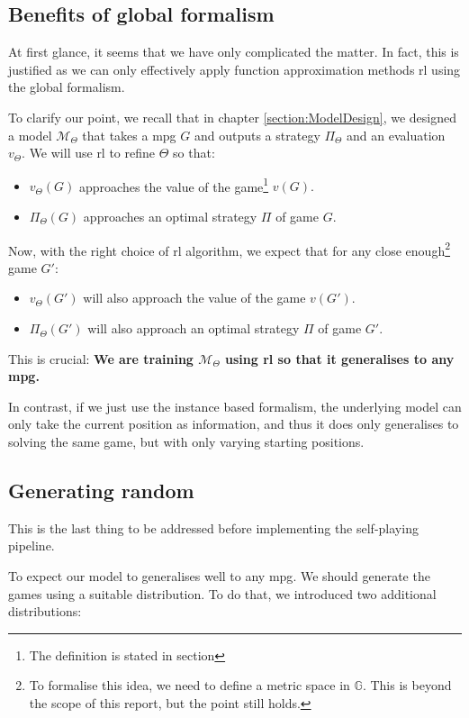 	\subsection{Benefits of global formalism}
	At first glance, it seems that we have only complicated the matter. In fact, this is justified as we can only effectively apply function approximation methods \acrshort{rl} using the global formalism.
	
	To clarify our point, we recall that in chapter \ref{section:ModelDesign}, we designed a model $\mathcal{M}_\Theta$ that takes a \acrshort{mpg} $G$ and outputs a strategy $\Pi_\Theta$ and an evaluation $v_\Theta.$ We will use \acrshort{rl} to refine $\Theta$ so that: 
	\begin{itemize}
		\item $v_\Theta(G)$ approaches the value of the game\footnote{The definition is stated in section} $v(G).$
		\item $\Pi_\Theta(G)$ approaches an optimal strategy $\Pi$ of game $G.$
	\end{itemize}
	Now, with the right choice of \acrshort{rl} algorithm, we expect that for any close enough\footnote{To formalise this idea, we need to define a metric space in $\mathbb{G}.$ This is beyond the scope of this report, but the point still holds.} game $G':$
	\begin{itemize}
		\item $v_\Theta(G')$ will also approach the value of the game $v(G').$
		\item $\Pi_\Theta(G')$ will also approach an optimal strategy $\Pi$ of game $G'.$
	\end{itemize}
	This is crucial: \textbf{We are training $\mathcal{M}_{\Theta}$ using \acrshort{rl} so that it generalises to any \acrshort{mpg}.}
	
	In contrast, if we just use the instance based formalism, the underlying model can only take the current position as information, and thus it does only generalises to solving the same game, but with only varying starting positions.
	\subsection{Generating random }
	This is the last thing to be addressed before implementing the self-playing pipeline.
	
	To expect our model to generalises well to any \acrshort{mpg}. We should generate the games using a suitable distribution. To do that, we introduced two additional distributions:
